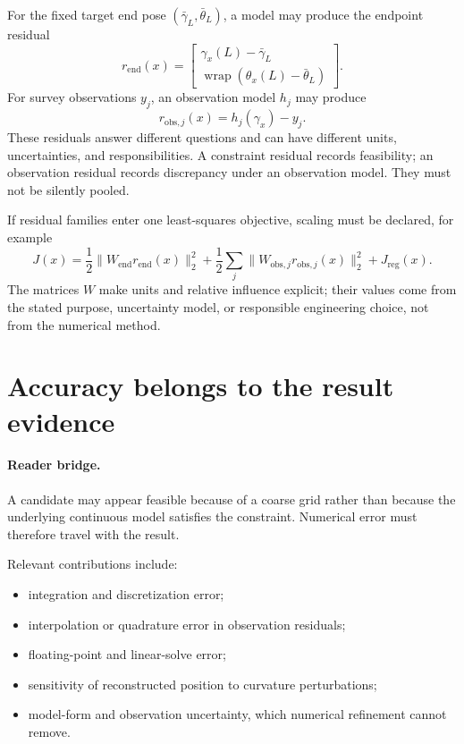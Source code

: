 For the fixed target end pose \((\bar\gamma_L,\bar\theta_L)\), a model may
produce the endpoint residual
\[
r_{\mathrm{end}}(x)=
\begin{bmatrix}
\gamma_x(L)-\bar\gamma_L\\
\operatorname{wrap}(\theta_x(L)-\bar\theta_L)
\end{bmatrix}.
\]
For survey observations \(y_j\), an observation model \(h_j\) may produce
\[
r_{\mathrm{obs},j}(x)=
h_j(\gamma_x)-y_j.
\]
These residuals answer different questions and can have different units,
uncertainties, and responsibilities. A constraint residual records
feasibility; an observation residual records discrepancy under an observation
model. They must not be silently pooled.

If residual families enter one least-squares objective, scaling must be
declared, for example
\[
J(x)=
\frac12\|W_{\mathrm{end}}r_{\mathrm{end}}(x)\|_2^2+
\frac12\sum_j
\|W_{\mathrm{obs},j}r_{\mathrm{obs},j}(x)\|_2^2+
J_{\mathrm{reg}}(x).
\]
The matrices \(W\) make units and relative influence explicit; their values
come from the stated purpose, uncertainty model, or responsible engineering
choice, not from the numerical method.

\section{Accuracy belongs to the result evidence}

\paragraph{Reader bridge.}
A candidate may appear feasible because of a coarse grid rather than because
the underlying continuous model satisfies the constraint. Numerical error
must therefore travel with the result.

Relevant contributions include:
\begin{itemize}
\item integration and discretization error;
\item interpolation or quadrature error in observation residuals;
\item floating-point and linear-solve error;
\item sensitivity of reconstructed position to curvature perturbations;
\item model-form and observation uncertainty, which numerical refinement
      cannot remove.
\end{itemize}

